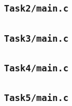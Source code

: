 \subsection{\texttt{Task2/main.c}}


\subsection{\texttt{Task3/main.c}}


\subsection{\texttt{Task4/main.c}}


\subsection{\texttt{Task5/main.c}}




